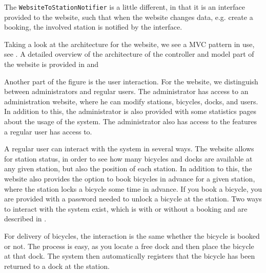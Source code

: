 The \texttt{WebsiteToStationNotifier} is a little different, in that it is an interface provided to the website, such that when the website changes data, e.g. create a booking, the involved station is notified by the interface.

Taking a look at the architecture for the website, we see a MVC pattern in use, see .
A detailed overview of the architecture of the controller and model part of the website is provided in  and 

Another part of the figure is the user interaction.
For the website, we distinguish between administrators and regular users.
The administrator has access to an administration website, where he can modify stations, bicycles, docks, and users.
In addition to this, the administrator is also provided with some statistics pages about the usage of the system.
The administrator also has access to the features a regular user has access to.

A regular user can interact with the system in several ways.
The website allows for station status, in order to see how many bicycles and docks are available at any given station, but also the position of each station.
In addition to this, the website also provides the option to book bicycles in advance for a given station, where the station locks a bicycle some time in advance.
If you book a bicycle, you are provided with a password needed to unlock a bicycle at the station.
Two ways to interact with the system exist, which is with or without a booking and are described in .

For delivery of bicycles, the interaction is the same whether the bicycle is booked or not.
The process is easy, as you locate a free dock and then place the bicycle at that dock.
The system then automatically registers that the bicycle has been returned to a dock at the station.


